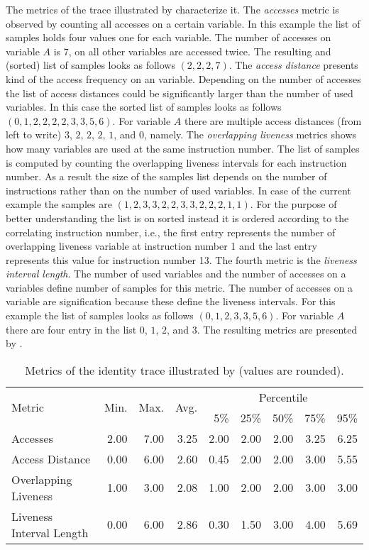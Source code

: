 \documentclass[onecolumn, openright, master, english, signatures]{dbrgrptt}
\begin{document}
The metrics of the \ac{trace} illustrated by  characterize it. The \emph{accesses} metric is observed by counting all accesses on a certain variable. In this example the list of samples holds four values one for each variable. The number of accesses on variable $A$ is $7$, on all other variables are accessed twice. The resulting and (sorted) list of samples looks as follows $(2, 2, 2, 7)$. The \emph{access distance} presents kind of the access frequency on an variable. Depending on the number of accesses the list of access distances could be significantly larger than the number of used variables. In this case the sorted list of samples looks as follows $(0, 1, 2, 2, 2, 2, 3, 3, 5, 6)$. For variable $A$ there are multiple access distances (from left to write) $3$, $2$, $2$, $2$, $1$, and $0$, namely. The \emph{overlapping liveness} metrics shows how many variables are used at the same instruction number. The list of samples is computed by counting the overlapping liveness intervals for each instruction number. As a result the size of the samples list depends on the number of instructions rather than on the number of used variables. In case of the current example the samples are $(1, 2, 3, 3, 2, 2, 3, 3, 2, 2, 2, 1, 1)$. For the purpose of better understanding the list is on sorted instead it is ordered according to the correlating instruction number, i.e., the first entry represents the number of overlapping liveness variable at instruction number 1 and the last entry represents this value for instruction number 13. The fourth metric is the \emph{liveness interval length}. The number of used variables and the number of accesses on a variables define number of samples for this metric. The number of accesses on a variable are signification because these define the liveness intervals. For this example the list of samples looks as follows $(0, 1, 2, 3, 3, 5, 6)$. For variable $A$ there are four entry in the list $0$, $1$, $2$, and $3$. The resulting metrics are presented by .

\begin{table}[!ht]
  \centering
  \begin{tabular}{lrrrrrrrr}
    \hline
    \multirow{2}{*}{Metric} & \multirow{2}{*}{Min.} & \multirow{2}{*}{Max.} & \multirow{2}{*}{Avg.} & \multicolumn{5}{c}{Percentile} \tabularnewline
    & & & & 5\% & 25\% & 50\% & 75\% & 95\% \tabularnewline
    \hline
    Accesses                 & 2.00 & 7.00 & 3.25 & 2.00 & 2.00 & 2.00 & 3.25 & 6.25 \\
    Access Distance          & 0.00 & 6.00 & 2.60 & 0.45 & 2.00 & 2.00 & 3.00 & 5.55 \\
    Overlapping Liveness        & 1.00 & 3.00 & 2.08 & 1.00 & 2.00 & 2.00 & 3.00 & 3.00 \\
    Liveness Interval Length & 0.00 & 6.00 & 2.86 & 0.30 & 1.50 & 3.00 & 4.00 & 5.69 \\
    \hline
  \end{tabular}
  \caption{Metrics of the identity \ac{trace} illustrated by  (values are rounded).}
  \label{tab:summarizing-example-metrics-original}
\end{table}
\end{document}
